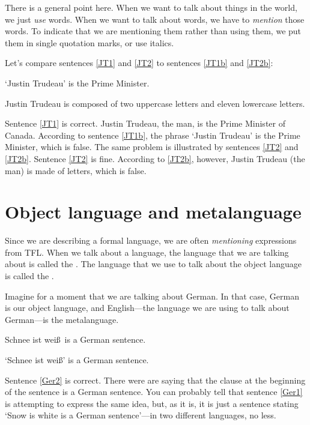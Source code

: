 There is a general point here. When we want to talk about things in the world, we just \emph{use} words. When we want to talk about words, we have to \emph{mention} those words. To indicate that we are mentioning them rather than using them, we put them in single quotation marks, or use italics. 

Let's compare sentences \ref{JT1} and \ref{JT2} to sentences \ref{JT1b} and \ref{JT2b}:
	\begin{earg}
		\item[\ex{JT1b}] `Justin Trudeau' is the Prime Minister.
		\item[\ex{JT2b}] Justin Trudeau is composed of two uppercase letters and eleven lowercase letters.
	\end{earg}
Sentence \ref{JT1} is correct. Justin Trudeau, the man, is the Prime Minister of Canada. According to sentence \ref{JT1b}, the phrase `Justin Trudeau' is the Prime Minister, which is false. The same problem is illustrated by sentences \ref{JT2} and \ref{JT2b}. Sentence \ref{JT2} is fine. According to \ref{JT2b}, however, Justin Trudeau (the man) is made of letters, which is false. 



\section{Object language and metalanguage}\label{s:Metalanguage}
Since we are describing a formal language, we are often \emph{mentioning} expressions from TFL. When we talk about a language, the language that we are talking about is called the . The language that we use to talk about the object language is called the .\label{def.metalanguage} 

Imagine for a moment that we are talking about German. In that case, German is our object language, and English---the language we are using to talk about German---is the metalanguage.
	\begin{earg}
		\item[\ex{Ger1}] Schnee ist wei\ss\ is a German sentence.
		\item[\ex{Ger2}]`Schnee ist wei\ss' is a German sentence.
	\end{earg}
Sentence \ref{Ger2} is correct. There were are saying that the clause at the beginning of the sentence is a German sentence. You can probably tell that sentence \ref{Ger1} is attempting to express the same idea, but, as it is, it is just a sentence stating `Snow is white is a German sentence'---in two different languages, no less. 

